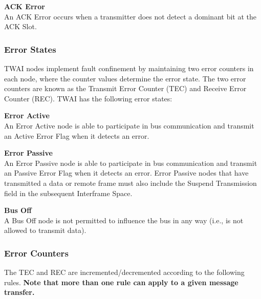 \documentclass[main\_\_EN.tex]{subfiles}
\begin{document}
{\bfseries ACK Error}\\
An ACK Error occurs when a transmitter does not detect a dominant bit at the ACK Slot.

\subsubsection{Error States}

TWAI nodes implement fault confinement by maintaining two error counters in each node, where the counter values determine the error state. The two error counters are known as the Transmit Error Counter (TEC) and Receive Error Counter (REC). TWAI has the following error states:

{\bfseries Error Active}\\
An Error Active node is able to participate in bus communication and transmit an Active Error Flag when it detects an error.

{\bfseries Error Passive}\\
An Error Passive node is able to participate in bus communication and transmit an Passive Error Flag when it detects an error. Error Passive nodes that have transmitted a data or remote frame must also include the Suspend Transmission field in the subsequent Interframe Space.

{\bfseries Bus Off}\\
A Bus Off node is not permitted to influence the bus in any way (i.e., is not allowed to transmit data).

\subsubsection{Error Counters}

The TEC and REC are incremented/decremented according to the following rules. \textbf{Note that more than one rule can apply to a given message transfer.}
\end{document}
